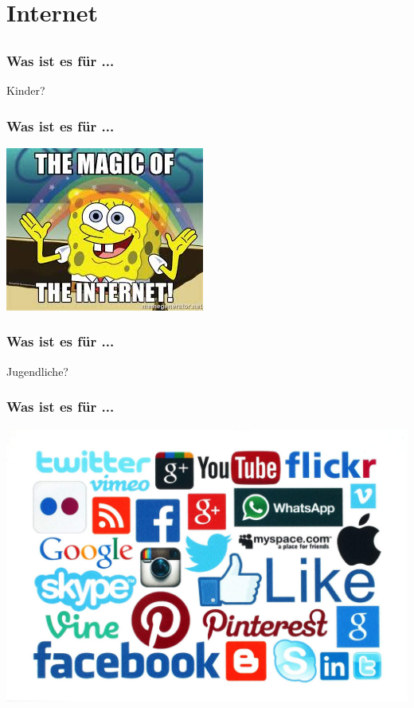 \documentclass[12pt]{beamer}
\begin{document}

\section{Internet}
\subsection{}

\begin{center}
\begin{frame}
	\frametitle{Was ist es für ...}
	Kinder?
\end{frame}
\begin{frame}
	\frametitle{Was ist es für ...}
	\includegraphics[height=0.7\textheight]{img//magic_internet.jpg}
\end{frame}
\begin{frame}
	\frametitle{Was ist es für ...}
	Jugendliche?
\end{frame}
\begin{frame}
	\frametitle{Was ist es für ...}
	\includegraphics[height=0.7\textheight]{img//social_networks.jpg}
\end{frame}

\end{center}
\end{document}
